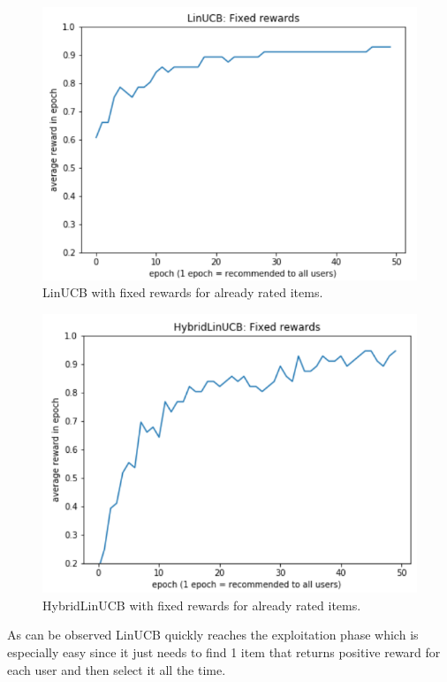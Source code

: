 \documentclass[12pt, titlepage]{article}
\begin{document}
\begin{figure}[h!]
 \centering
 \includegraphics[scale=0.5]{img/LinUCB-fixed}
 \caption{LinUCB with fixed rewards for already rated items.}
 \label{fig:linUCB-fixed}
\end{figure}

\begin{figure}[h!]
 \centering
 \includegraphics[scale=0.5]{img/HybridLinUCB-fixed}
 \caption{HybridLinUCB with fixed rewards for already rated items. }
 \label{fig:HybridlinUCB-fixed}
\end{figure}

As can be observed LinUCB quickly reaches the exploitation phase which is especially easy since it just needs to find 1 item that returns positive reward for each user and then select it all the time.
\end{document}
